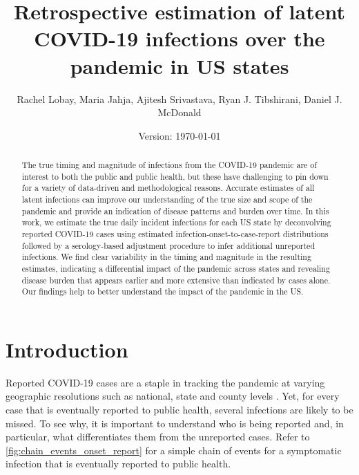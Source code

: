 \documentclass{article}
\begin{document}
\title{Retrospective estimation of latent COVID-19 infections over the pandemic in US states}
\author{Rachel Lobay, Maria Jahja, Ajitesh Srivastava, Ryan J. Tibshirani, Daniel J. McDonald}
\date{Version: \today}
\maketitle

\begin{abstract}
The true timing and magnitude of infections from the COVID-19 pandemic are of interest to both the public and public health, but these have challenging to pin down for a variety of data-driven and methodological reasons. Accurate estimates of all latent infections can improve our understanding of the true size and scope of the pandemic and provide an indication of disease patterns and burden over time. In this work, we estimate the true daily incident infections for each US state by deconvolving reported COVID-19 cases using estimated infection-onset-to-case-report distributions followed by a serology-based adjustment procedure to infer additional unreported infections. We find clear variability in the timing and magnitude in the resulting estimates, indicating a differential impact of the pandemic across states and revealing disease burden that appears earlier and more extensive than indicated by cases alone. Our findings help to better understand the impact of the pandemic in the US.
\end{abstract}

\section{Introduction}

Reported COVID-19 cases are a staple in tracking the pandemic at varying geographic resolutions such as national, state and county levels \citep{dong2020interactive, nyt2020corona, wp2020tracking}. Yet, for every case that is eventually reported to public health, several infections are likely to be missed. To see why, it is important to understand who is being reported and, in particular, what differentiates them from the unreported cases. Refer to \autoref{fig:chain_events_onset_report} for a simple chain of events for a symptomatic infection that is eventually reported to public health. 
\end{document}
